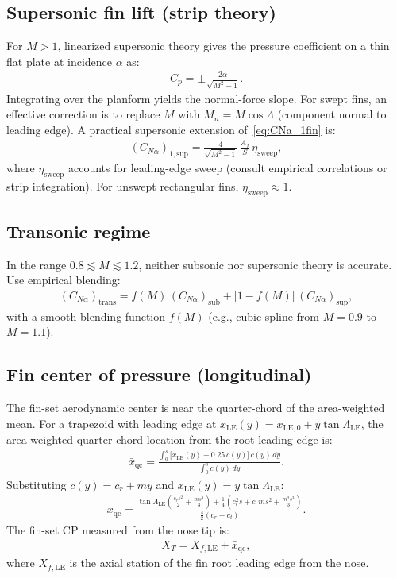 \documentclass[11pt]{article}
\begin{document}
\subsection{Supersonic fin lift (strip theory)}
For $M>1$, linearized supersonic theory gives the pressure coefficient on a thin flat plate at incidence $\alpha$ as:
\begin{align}
C_p = \pm \frac{2\alpha}{\sqrt{M^2-1}}.
\end{align}
Integrating over the planform yields the normal-force slope. For swept fins, an effective correction is to replace $M$ with $M_n = M\cos\Lambda$ (component normal to leading edge). A practical supersonic extension of~\eqref{eq:CNa_1fin} is:
\begin{align}
(C_{N\alpha})_{1,\text{sup}} = \frac{4}{\sqrt{M^2-1}}\,\frac{A_f}{S}\,\eta_{\text{sweep}},
\end{align}
where $\eta_{\text{sweep}}$ accounts for leading-edge sweep (consult empirical correlations or strip integration). For unswept rectangular fins, $\eta_{\text{sweep}}\approx 1$.

\subsection{Transonic regime}
In the range $0.8\lesssim M\lesssim 1.2$, neither subsonic nor supersonic theory is accurate. Use empirical blending:
\begin{align}
(C_{N\alpha})_{\text{trans}} = f(M)\,(C_{N\alpha})_{\text{sub}} + \big[1-f(M)\big]\,(C_{N\alpha})_{\text{sup}},
\end{align}
with a smooth blending function $f(M)$ (e.g., cubic spline from $M=0.9$ to $M=1.1$).

\subsection{Fin center of pressure (longitudinal)}
The fin-set aerodynamic center is near the quarter-chord of the area-weighted mean. For a trapezoid with leading edge at $x_{\text{LE}}(y)=x_{\text{LE},0}+y\tan\Lambda_{\text{LE}}$, the area-weighted quarter-chord location from the root leading edge is:
\begin{align}
\label{eq:xbar_qc_fin}
\bar x_{\text{qc}} = \frac{\displaystyle\int_0^s \big[x_{\text{LE}}(y)+0.25\,c(y)\big]\,c(y)\,dy}{\displaystyle\int_0^s c(y)\,dy}.
\end{align}
Substituting $c(y)=c_r+my$ and $x_{\text{LE}}(y)=y\tan\Lambda_{\text{LE}}$:
\begin{align}
\bar x_{\text{qc}} = \frac{\tan\Lambda_{\text{LE}}\left(\frac{c_r s^2}{2}+\frac{ms^3}{3}\right) + \frac{1}{4}\left(c_r^2 s + c_r m s^2 + \frac{m^2 s^3}{3}\right)}{\frac{s}{2}(c_r+c_t)}.
\end{align}
The fin-set CP measured from the nose tip is:
\begin{align}
X_T = X_{f,\text{LE}} + \bar x_{\text{qc}},
\end{align}
where $X_{f,\text{LE}}$ is the axial station of the fin root leading edge from the nose.
\end{document}
